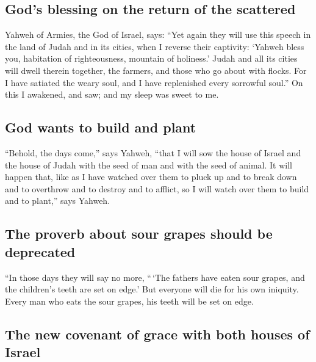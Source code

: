 \hypertarget{gods-blessing-on-the-return-of-the-scattered}{%
\subsection{God's blessing on the return of the
scattered}\label{gods-blessing-on-the-return-of-the-scattered}}

 Yahweh of Armies, the God of Israel, says: ``Yet again
they will use this speech in the land of Judah and in its cities, when I
reverse their captivity: `Yahweh bless you, habitation of righteousness,
mountain of holiness.'  Judah and all its cities will
dwell therein together, the farmers, and those who go about with flocks.
 For I have satiated the weary soul, and I have
replenished every sorrowful soul.''  On this I awakened,
and saw; and my sleep was sweet to me.

\hypertarget{god-wants-to-build-and-plant}{%
\subsection{God wants to build and
plant}\label{god-wants-to-build-and-plant}}

 ``Behold, the days come,'' says Yahweh, ``that I will
sow the house of Israel and the house of Judah with the seed of man and
with the seed of animal.  It will happen that, like as I
have watched over them to pluck up and to break down and to overthrow
and to destroy and to afflict, so I will watch over them to build and to
plant,'' says Yahweh.

\hypertarget{the-proverb-about-sour-grapes-should-be-deprecated}{%
\subsection{The proverb about sour grapes should be
deprecated}\label{the-proverb-about-sour-grapes-should-be-deprecated}}

 ``In those days they will say no more, ``\,`The fathers
have eaten sour grapes, and the children's teeth are set on edge.'
 But everyone will die for his own iniquity. Every man
who eats the sour grapes, his teeth will be set on edge.

\hypertarget{the-new-covenant-of-grace-with-both-houses-of-israel}{%
\subsection{The new covenant of grace with both houses of
Israel}\label{the-new-covenant-of-grace-with-both-houses-of-israel}}

